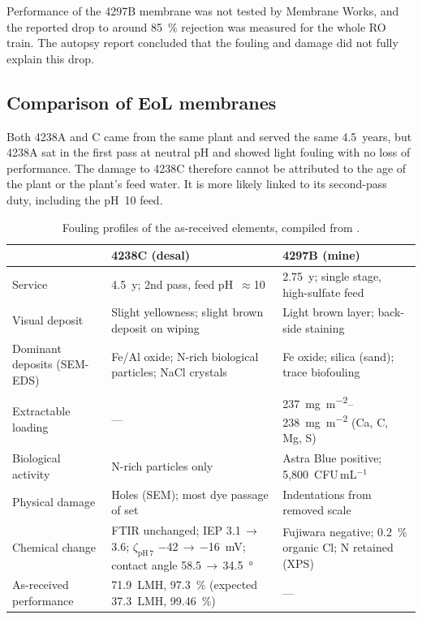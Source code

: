 Performance of the 4297B membrane was not tested by Membrane Works, and the reported drop to around \qty{85}{\percent} rejection was measured for the whole RO train. The autopsy report concluded that the fouling and damage did not fully explain this drop. 




\subsection{Comparison of EoL membranes}
Both 4238A and C came from the same plant and served the same \qty{4.5}{years}, but 4238A sat in the first pass at neutral pH and showed light fouling with no loss of performance. The damage to 4238C therefore cannot be attributed to the age of the plant or the plant's feed water. It is more likely linked to its second-pass duty, including the pH~10 feed.
\begin{table}[htbp]
  \centering
  \small
  \caption{Fouling profiles of the as-received elements, compiled from
  \cite{MembraneWorks2025Desal,MembraneWorks2026Mine}.}
  \label{tab:fouling-profiles}
  \begin{tabular}{p{3.2cm}p{5.4cm}p{5.4cm}}
    \toprule
    & 4238C (desal) & 4297B (mine) \\
    \midrule
    Service & \qty{4.5}{y}; 2nd pass, feed pH~$\approx$10
            & \qty{2.75}{y}; single stage, high-sulfate feed \\
    Visual deposit & Slight yellowness; slight brown deposit on wiping
                   & Light brown layer; back-side staining \\
    Dominant deposits (SEM-EDS) & Fe/Al oxide; N-rich biological particles;
                                  NaCl crystals
                                & Fe oxide; silica (sand); trace biofouling \\
    Extractable loading & --- & \qtyrange{237}{238}{mg.m^{-2}} (Ca, C, Mg, S) \\
    Biological activity & N-rich particles only
                        & Astra Blue positive; 5,800~CFU\,mL$^{-1}$ \\
    Physical damage & Holes (SEM); most dye passage of set
                    & Indentations from removed scale \\
    Chemical change & FTIR unchanged; IEP 3.1\,$\to$\,3.6;
                      $\zeta_{\mathrm{pH\,7}}$ \qty{-42}{}\,$\to$\,\qty{-16}{mV};
                      contact angle \qty{58.5}{}\,$\to$\,\qty{34.5}{\degree}
                    & Fujiwara negative; \qty{0.2}{\percent} organic Cl;
                      N retained (XPS) \\
    As-received performance & \qty{71.9}{LMH}, \qty{97.3}{\percent}
                              (expected \qty{37.3}{LMH}, \qty{99.46}{\percent})
                            & --- \\
    \bottomrule
  \end{tabular}
\end{table}

